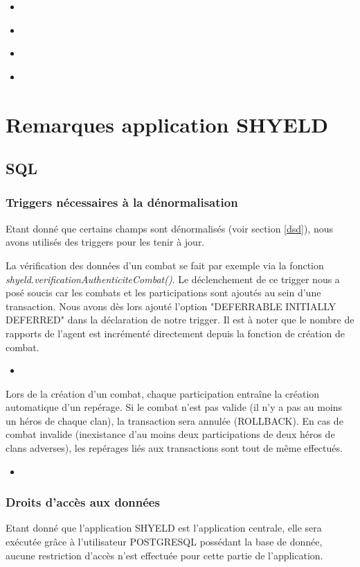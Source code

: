 \documentclass{article}[12pt]
\newcommand{\SQLcode}[2]{
	\begin{itemize}
		\item[]
	\end{itemize}
}
\begin{document}
   \SQLcode{classement_reperages}{Obtenir un classement des héros en fonction de leurs repérages}
   
\SQLcode{affichage_agents}{Afficher le contenu de la table shyeld.agents}

\SQLcode{affichage_combats}{Afficher le contenu de la table shyeld.combats}

\SQLcode{affichage_reperages}{Afficher le contenu de la table shyeld.reperages}
    
	\section{Remarques application SHYELD}
	\label{shyield}
	\subsection{SQL}
		
	\subsubsection{Triggers nécessaires à la dénormalisation}
	
Etant donné que certains champs sont dénormalisés (voir section \ref{dsd}), nous avons utilisés des triggers pour les tenir à jour.

 La vérification des données d'un combat se fait par exemple via la fonction \textit{shyeld.verificationAuthenticiteCombat()}. Le déclenchement de ce trigger nous a posé soucis car les combats et les participations sont ajoutés au sein d'une transaction. Nous avons dès lors ajouté l'option "DEFERRABLE INITIALLY DEFERRED" dans la déclaration de notre trigger. Il est à noter que le nombre de rapports de l'agent est incrémenté directement depuis la fonction de création de combat.
 	\SQLcode{triggerCombat}{Trigger de vérification d'un combat}
 	
 Lors de la création d'un combat, chaque participation entraîne la création automatique d'un repérage. Si le combat n'est pas valide (il n'y a pas au moins un héros de chaque clan), la transaction sera annulée (ROLLBACK). En cas de combat invalide (inexistance d'au moins deux participations de deux héros de clans adverses), les repérages liés aux transactions sont tout de même effectués.
 	\SQLcode{triggerReperage}{Trigger de création automatique de repérage en cas d'insertion d'une participation}
 
	
	\subsubsection{Droits d'accès aux données}
	Etant donné que l'application SHYELD est l'application centrale, elle sera exécutée grâce à l'utilisateur POSTGRESQL possédant la base de donnée, aucune restriction d'accès n'est effectuée pour cette partie de l'application.
\end{document}
